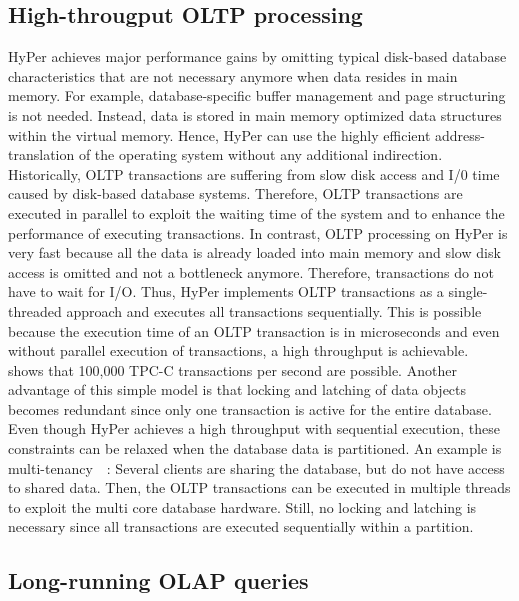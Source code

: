 \subsection{High-througput OLTP processing}
HyPer achieves major performance gains by omitting typical disk-based database characteristics that are not necessary anymore when data resides in main memory. For example, database-specific buffer management and page structuring is not needed. Instead, data is stored in main memory optimized data structures within the virtual memory. Hence, HyPer can use the highly efficient address-translation of the operating system without any additional indirection.
\\
Historically, OLTP transactions are suffering from slow disk access and I/0 time caused by disk-based database systems. Therefore, OLTP transactions are executed in parallel to exploit the waiting time of the system and to enhance the performance of executing transactions.
In contrast, OLTP processing on HyPer is very fast because all the data is already loaded into main memory and slow disk access is omitted and not a bottleneck anymore. Therefore, transactions do not have to wait for I/O. Thus, HyPer implements OLTP transactions as a single-threaded approach and executes all transactions sequentially. This is possible because the execution time of an OLTP transaction is in microseconds and even without parallel execution of transactions, a high throughput is achievable.~\parencite{brawnywimpy} shows that 100,000 TPC-C transactions per second are possible. Another advantage of this simple model is that locking and latching of data objects becomes redundant since only one transaction is active for the entire database. 
\\
Even though HyPer achieves a high throughput with sequential execution, these constraints can be relaxed when the database data is partitioned. An example is multi-tenancy~\parencite{mt1}~\parencite{mt2}: Several clients are sharing the database, but do not have access to shared data. Then, the OLTP transactions can be executed in multiple threads to exploit the multi core database hardware. Still, no locking and latching is necessary since all transactions are executed sequentially within a partition.

\subsection{Long-running OLAP queries}

